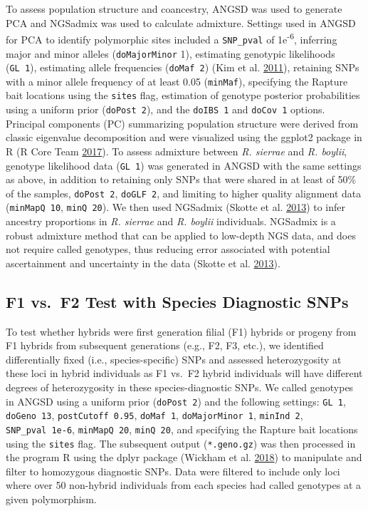 \documentclass[proquest,12pt,final]{ucthesis-CA2012} %
\begin{document}
\begin{ucmainmatter}
To assess population structure and coancestry, ANGSD was used to
generate PCA and NGSadmix was used to calculate admixture. Settings used
in ANGSD for PCA to identify polymorphic sites included a
\texttt{SNP\_pval} of 1e\textsuperscript{-6}, inferring major and minor
alleles (\texttt{doMajorMinor} 1), estimating genotypic likelihoods
(\texttt{GL\ 1}), estimating allele frequencies (\texttt{doMaf\ 2}) (Kim
et al. \protect\hyperlink{ref-kim_estimation_2011}{2011}), retaining
SNPs with a minor allele frequency of at least 0.05 (\texttt{minMaf}),
specifying the Rapture bait locations using the \texttt{sites} flag,
estimation of genotype posterior probabilities using a uniform prior
(\texttt{doPost\ 2}), and the \texttt{doIBS\ 1} and \texttt{doCov\ 1}
options. Principal components (PC) summarizing population structure were
derived from classic eigenvalue decomposition and were visualized using
the ggplot2 package in R (R Core Team
\protect\hyperlink{ref-r_core_team_r_2017}{2017}). To assess admixture
between \emph{R. sierrae} and \emph{R. boylii}, genotype likelihood data
(\texttt{GL\ 1}) was generated in ANGSD with the same settings as above,
in addition to retaining only SNPs that were shared in at least of 50\%
of the samples, \texttt{doPost\ 2}, \texttt{doGLF\ 2}, and limiting to
higher quality alignment data (\texttt{minMapQ\ 10}, \texttt{minQ\ 20}).
We then used NGSadmix (Skotte et al.
\protect\hyperlink{ref-skotte_estimating_2013}{2013}) to infer ancestry
proportions in \emph{R. sierrae} and \emph{R. boylii} individuals.
NGSadmix is a robust admixture method that can be applied to low-depth
NGS data, and does not require called genotypes, thus reducing error
associated with potential ascertainment and uncertainty in the data
(Skotte et al. \protect\hyperlink{ref-skotte_estimating_2013}{2013}).

\hypertarget{f1vsf2}{%
\subsection{F1 vs.~F2 Test with Species Diagnostic SNPs}\label{f1vsf2}}

To test whether hybrids were first generation filial (F1) hybrids or
progeny from F1 hybrids from subsequent generations (e.g., F2, F3,
etc.), we identified differentially fixed (i.e., species-specific) SNPs
and assessed heterozygosity at these loci in hybrid individuals as F1
vs.~F2 hybrid individuals will have different degrees of heterozygosity
in these species-diagnostic SNPs. We called genotypes in ANGSD using a
uniform prior (\texttt{doPost\ 2}) and the following settings:
\texttt{GL\ 1}, \texttt{doGeno\ 13}, \texttt{postCutoff\ 0.95},
\texttt{doMaf\ 1}, \texttt{doMajorMinor\ 1}, \texttt{minInd\ 2},
\texttt{SNP\_pval\ 1e-6}, \texttt{minMapQ\ 20}, \texttt{minQ\ 20}, and
specifying the Rapture bait locations using the \texttt{sites} flag. The
subsequent output (\texttt{*.geno.gz}) was then processed in the program
R using the dplyr package (Wickham et al.
\protect\hyperlink{ref-wickham_dplyr_2018}{2018}) to manipulate and
filter to homozygous diagnostic SNPs. Data were filtered to include only
loci where over 50 non-hybrid individuals from each species had called
genotypes at a given polymorphism.


\end{ucmainmatter}
\end{document}
